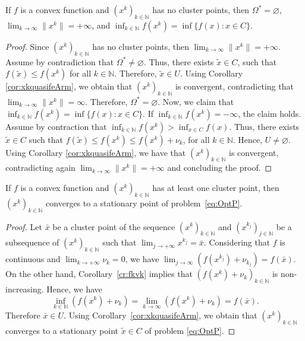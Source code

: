 \begin{theorem}
	If $f$ is a convex function and $(x^k)_{k\in\mathbb{N}}$ has no cluster points,  then $\Omega^* = \varnothing$, $\lim_{k \to \infty} \|x^k\|= +\infty$, and $\inf_{k\in {\mathbb N}} f(x^k) = \inf \{f(x) : x \in C\}$.
\end{theorem}
\begin{proof}
	Since $(x^k)_{k\in\mathbb{N}}$ has no cluster points, then $\lim_{k \to \infty} \|x^k\|= +\infty$. Assume by contradiction that $\Omega^* \neq  \varnothing$.  Thus, there exists  $\tilde{x}\in C$, such that  $f(\tilde{x}) \leq f(x^k)$ for all $k\in {\mathbb N}$. Therefore, $\tilde{x} \in U$. Using Corollary \ref{cor:xkquasifeArm}, we obtain that $(x^k)_{k\in\mathbb{N}}$ is convergent, contradicting that $\lim_{k \to \infty} \|x^k\|= \infty$. Therefore, $\Omega^* = \varnothing$. Now, we claim that $\inf_{k\in {\mathbb N}} f(x^k) = \inf \{f(x) : x \in C\}$.   If $\inf_{k\in {\mathbb N}} f(x^k) = -\infty$, the claim holds. Assume by contraction that   $\inf_{k\in {\mathbb N}} f(x^k) >  \inf_{x \in C} f(x)$.  Thus,  there exists $\tilde{x} \in C$ such that $f(\tilde{x}) \leq f(x^k)\leq f(x^k)+\nu_k $,  for all $k\in {\mathbb N}$.  Hence, $U \neq \varnothing$.  Using Corollary \ref{cor:xkquasifeArm}, we have that  $(x^k)_{k\in\mathbb{N}}$ is convergent, contradicting again $\lim_{k \to \infty} \|x^k\|= +\infty$ and concluding the proof.
\end{proof}

\begin{corollary}
	If $f$ is a convex function and $(x^k)_{k\in\mathbb{N}}$ has at least one cluster point, then    $(x^k)_{k\in\mathbb{N}}$ converges to a stationary point of problem~\eqref{eq:OptP}.
\end{corollary}
\begin{proof}
	Let $\bar{x}$ be a cluster point of  the sequence $(x^k)_{k\in\mathbb{N}}$ and $(x^{k_j})_{j\in\mathbb{N}}$ be a subsequence of $(x^k)_{k\in\mathbb{N}}$ such that $\lim_{j\to +\infty} x^{k_j} = \bar{x}$. Considering that  $f$ is continuous and $\lim_{k\to +\infty} \nu_{k} = 0$, we have $\lim_{j \to \infty} (f(x^{k_j})+\nu_{k_j})= f(\bar{x})$.    On the other hand,  Corollary~\ref{cr:fkvk}   implies that   $(f(x^{k})+\nu_k)_{k\in\mathbb{N}}$ is non-increasing.  Hence, we have   
	$$\inf_{k\in {\mathbb N}} (f(x^{k})+\nu_{k})=\lim_{k\to \infty} (f(x^{k})+\nu_{k})= f(\bar{x}).$$  
	Therefore $\bar{x} \in U$. Using  Corollary~\ref{cor:xkquasifeArm}, we obtain that $(x^k)_{k\in\mathbb{N}}$ converges to a stationary point $\tilde{x}\in C$ of  problem \eqref{eq:OptP}.
\end{proof}

